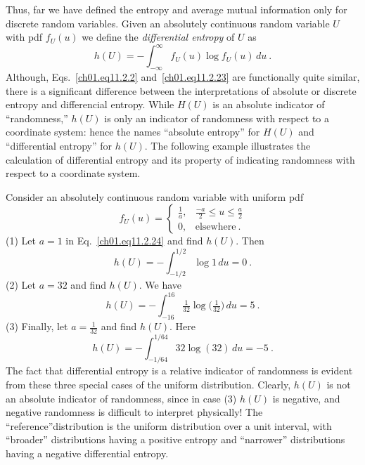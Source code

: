 Thus, far we have defined the entropy and average mutual information only
for discrete random variables. Given an absolutely continuous random variable
$U$ with pdf $f_U(u)$ we define the \textit{differential entropy}
of $U$ as
\begin{equation}
 h(U) = - \int^\infty_{-\infty} f_U (u) \log f_U (u)\, du~.
\label{ch01.eq11.2.23}
\end{equation}
Although, Eqs.~\eqref{ch01.eq11.2.2} and~\eqref{ch01.eq11.2.23} are
functionally quite similar, there is a significant difference between
the interpretations of absolute or discrete entropy and differencial entropy.
While $H(U)$ is an absolute indicator of ``randomness,'' $h(U)$ is
only an indicator of randomness with respect to a coordinate system:
hence the names ``absolute entropy'' for $H(U)$ and ``differential entropy''
for $h(U)$.
The following example illustrates the calculation of differential entropy
and its property of indicating randomness with respect to a coordinate system.

\begin{example}
\label{ch01.ex11.2.3}
Consider an absolutely continuous random variable with uniform pdf
\begin{equation}
 f_U(u)=
 \left\{
 \begin{array}{cl}
 \displaystyle \frac{1}{a},
 & \displaystyle \frac{-a}{2} \leq u \leq \frac{a}{2}\\[2.5mm]
 \displaystyle 0, & \textrm{elsewhere}~.
 \end{array}
 \right.
\label{ch01.eq11.2.24}
\end{equation}
(1) Let $a=1$ in Eq.~\eqref{ch01.eq11.2.24} and find $h(U)$. Then
\begin{equation}
 h(U) = - \int^{1/2}_{-1/2} \log 1 \, du = 0~.
\label{ch01.eq11.2.25}
\end{equation}
(2) Let $a= 32$ and find $h(U)$. We have
\begin{equation}
 h(U) = - \int^{16}_{-16} \tfrac{1}{32}
          \log \big( \tfrac{1}{32}\big)\, du =  5~.
\label{ch01.eq11.2.26}
\end{equation}
(3) Finally, let $a = \tfrac{1}{32}$ and find $h(U)$. Here
\begin{equation}
 h(U) = - \int^{1/64}_{-1/64} 32 \log (32)\, du = - 5~.
\label{ch01.eq11.2.27}
\end{equation}
The fact that differential entropy is a relative indicator of randomness is
evident from these three special cases of the uniform distribution. Clearly,
$h(U)$ is not an absolute indicator of randomness, since in case (3) $h(U)$
is
negative, and negative randomness is difficult to interpret physically!
The ``reference''distribution is the uniform distribution over a unit
interval, with
``broader'' distributions having a positive entropy and ``narrower''
distributions having a negative differential entropy.
\end{example}


